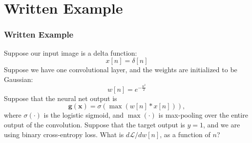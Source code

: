 \documentclass{beamer}
\begin{document}
\section[Example]{Written Example}
\setcounter{subsection}{1}

\begin{frame}
  \frametitle{Written Example}
  Suppose our input image is a delta function:
  \begin{displaymath}
    x[n] = \delta[n]
  \end{displaymath}
  Suppose we have one convolutional layer, and the weights are
  initialized to be Gaussian:
  \begin{displaymath}
    w[n] = e^{-\frac{n^2}{2}}
  \end{displaymath}
  Suppose that the neural net output is
  \begin{displaymath}
    \mathbf{g}(\mathbf{x})=\sigma\left(\max\left(w[n]\ast x[n]\right)\right),
  \end{displaymath}
  where $\sigma(\cdot)$ is the logistic sigmoid, and $\max(\cdot)$ is
  max-pooling over the entire output of the convolution.  Suppose that
  the target output is $y=1$, and we are using binary cross-entropy
  loss.  What is $d{\mathcal L}/dw[n]$, as a function of $n$?
\end{frame}
\end{document}
